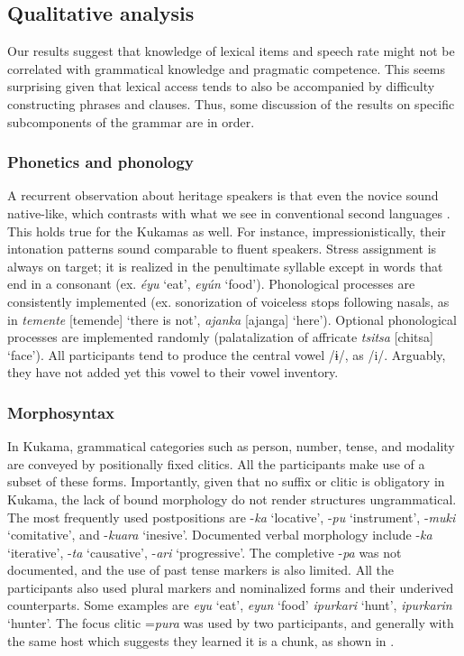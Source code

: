 \documentclass[output=paper]{langscibook}
\begin{document}
\subsection{Qualitative analysis}

Our results suggest that knowledge of lexical items and speech rate might not be correlated with grammatical knowledge and pragmatic competence. This seems surprising given that lexical access tends to also be accompanied by difficulty constructing phrases and clauses. Thus, some discussion of the results on specific subcomponents of the grammar are in order.

\subsubsection{­Phonetics and phonology}
A recurrent observation about heritage speakers is that even the novice sound native-like, which contrasts with what we see in conventional second languages \citep{PolinskyKagan2007}. This holds true for the Kukamas as well. For instance, impressionistically, their intonation patterns sound comparable to fluent speakers. Stress assignment is always on target; it is realized in the penultimate syllable except in words that end in a consonant (ex. \textit{éyu} ‘eat’, \textit{eyún} ‘food’). Phonological processes are consistently implemented (ex. sonorization of voiceless stops following nasals, as in \textit{temente} [temende] ‘there is not’, \textit{ajanka} [ajanga] ‘here’).
Optional phonological processes are implemented randomly (palatalization of affricate \textit{tsitsa} [chitsa{]} `face'). All participants tend to produce the central vowel /ɨ/, as /i/. Arguably, they have not added yet this vowel to their vowel inventory.

\subsubsection{Morphosyntax}
In Kukama, grammatical categories such as person, number, tense, and modality are conveyed by positionally fixed clitics. All the participants make use of a subset of these forms. Importantly, given that no suffix or clitic is obligatory in Kukama, the lack of bound morphology do not render structures ungrammatical. The most frequently used postpositions are -{\textit{ka}}{ ‘locative’, -}{\textit{pu}}{ ‘instrument’, -}{\textit{muki}}{ ‘comitative’, and -}{\textit{kuara}}{ ‘inesive’. Documented verbal morphology include -}{\textit{ka}}{ ‘iterative’, -}{\textit{ta}}{ ‘causative’, -}{\textit{ari}}{ ‘progressive’. The completive -}{\textit{pa}}{ was not documented, and the use of past tense markers is also limited. All the participants also used plural markers and nominalized forms and their underived counterparts. Some examples are} {\textit{eyu}}{ ‘eat’,} {\textit{eyun}}{ ‘food’} {\textit{ipurkari}}{ ‘hunt’,} {\textit{ipurkarin}}{ ‘hunter’. The focus clitic =}{\textit{pura}} was used by two participants, and generally with the same host which suggests they learned it is a chunk, as shown in .
\end{document}
